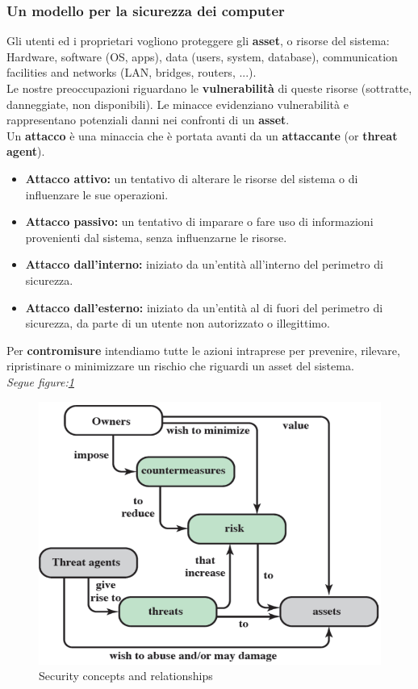 \documentclass[12pt]{article}
\begin{document}
		\subsubsection{Un modello per la sicurezza dei computer}
			Gli utenti ed i proprietari vogliono proteggere gli \textbf{asset}, o risorse del sistema: Hardware, software (OS, apps), data (users, system, database), communication facilities and networks (LAN, bridges, routers, ...).\\
			Le nostre preoccupazioni riguardano le \textbf{vulnerabilità} di queste risorse (sottratte, danneggiate, non disponibili).
			Le minacce evidenziano vulnerabilità e rappresentano potenziali danni nei confronti di un \textbf{asset}. \\
			Un \textbf{attacco} è una minaccia che è portata avanti da un \textbf{attaccante} (or \textbf{threat agent}). 	
			\begin{itemize}
				\item \textbf{Attacco attivo:} un tentativo di alterare le risorse del sistema o di influenzare le sue operazioni.
				\item \textbf{Attacco passivo:} un tentativo di imparare o fare uso di informazioni provenienti dal sistema, senza influenzarne le risorse.
				\item \textbf{Attacco dall'interno:} iniziato da un'entità all'interno del perimetro di sicurezza.
				\item \textbf{Attacco dall'esterno:} iniziato da un'entità al di fuori del perimetro di sicurezza, da parte di un utente non autorizzato o illegittimo.
			\end{itemize}
			 Per \textbf{contromisure} intendiamo tutte le azioni intraprese per prevenire, rilevare, ripristinare o minimizzare un rischio che riguardi un asset del sistema. \\
			 \textit{Segue figure:\ref{fig:1}}
			 \begin{figure}[h!]
			 	\centering
			 	\includegraphics[scale=0.40]{img/securityrel.PNG}
			 	\caption{Security concepts and relationships\label{fig:1}}
			 \end{figure}
			 
\end{document}
